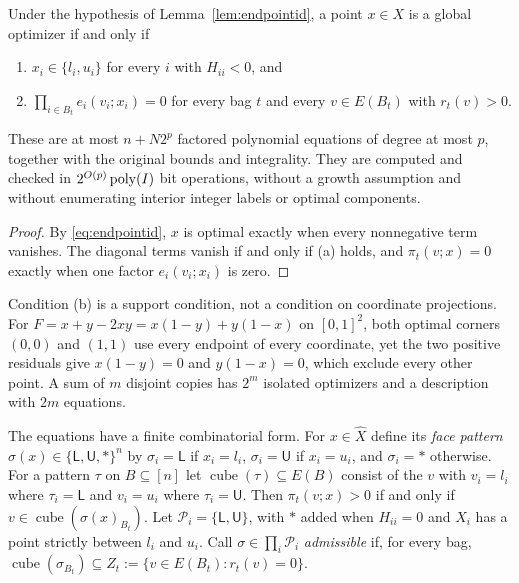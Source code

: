 \begin{theorem}\label{thm:endpointset}
Under the hypothesis of Lemma~\ref{lem:endpointid}, a point $x\in X$ is a
global optimizer if and only if
\begin{enumerate}
\item[(a)] $x_i\in\{l_i,u_i\}$ for every $i$ with $H_{ii}<0$, and
\item[(b)] $\prod_{i\in B_t}e_i(v_i;x_i)=0$ for every bag $t$ and every
$v\in E(B_t)$ with $r_t(v)>0$.
\end{enumerate}
These are at most $n+N2^p$ factored polynomial equations of degree at most
$p$, together with the original bounds and integrality. They are computed and
checked in $2^{O(p)}\operatorname{poly}(I)$ bit operations, without a growth assumption and
without enumerating interior integer labels or optimal components.
\end{theorem}

\begin{proof}
By \eqref{eq:endpointid}, $x$ is optimal exactly when every nonnegative term
vanishes. The diagonal terms vanish if and only if (a) holds, and
$\pi_t(v;x)=0$ exactly when one factor $e_i(v_i;x_i)$ is zero.
\end{proof}

Condition (b) is a support condition, not a condition on coordinate
projections. For $F=x+y-2xy=x(1-y)+y(1-x)$ on $[0,1]^2$, both optimal
corners $(0,0)$ and $(1,1)$ use every endpoint of every coordinate, yet the
two positive residuals give $x(1-y)=0$ and $y(1-x)=0$, which exclude every
other point. A sum of $m$ disjoint copies has $2^m$ isolated optimizers and
a description with $2m$ equations.

The equations have a finite combinatorial form. For $x\in\hat X$ define its
\emph{face pattern} $\sigma(x)\in\{\mathsf L,\mathsf U,\ast\}^n$ by
$\sigma_i=\mathsf L$ if $x_i=l_i$, $\sigma_i=\mathsf U$ if $x_i=u_i$, and
$\sigma_i=\ast$ otherwise. For a pattern $\tau$ on $B\subseteq[n]$ let
$\operatorname{cube}(\tau)\subseteq E(B)$ consist of the $v$ with $v_i=l_i$
where $\tau_i=\mathsf L$ and $v_i=u_i$ where $\tau_i=\mathsf U$. Then
$\pi_t(v;x)>0$ if and only if $v\in\operatorname{cube}(\sigma(x)_{B_t})$.
Let $\mathcal P_i=\{\mathsf L,\mathsf U\}$, with $\ast$ added when $H_{ii}=0$
and $X_i$ has a point strictly between $l_i$ and $u_i$. Call
$\sigma\in\prod_i\mathcal P_i$ \emph{admissible} if, for every bag,
$\operatorname{cube}(\sigma_{B_t})\subseteq Z_t:=\{v\in E(B_t):r_t(v)=0\}$.

